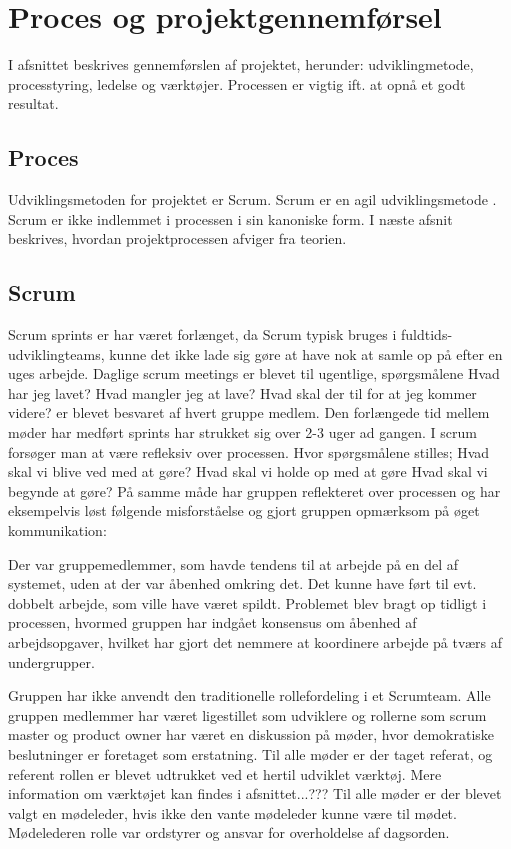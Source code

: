 \chapter{Proces og projektgennemførsel}

I afsnittet beskrives gennemførslen af projektet, herunder: udviklingmetode, processtyring, ledelse og værktøjer. Processen er vigtig ift. at opnå et godt resultat. 

\section{Proces}
Udviklingsmetoden for projektet er Scrum. Scrum er en agil udviklingsmetode \cite[kap. 1]{robertmartin2006}. Scrum er ikke indlemmet i processen i sin kanoniske form. I næste afsnit beskrives, hvordan projektprocessen afviger fra teorien.

\section{Scrum}
Scrum sprints er har været forlænget, da Scrum typisk bruges i fuldtids-udviklingteams, kunne det ikke lade sig gøre at have nok at samle op på efter en uges arbejde. Daglige scrum meetings er blevet til ugentlige, spørgsmålene Hvad har jeg lavet? Hvad mangler jeg at lave? Hvad skal der til for at jeg kommer videre? er blevet besvaret af hvert gruppe medlem. Den forlængede tid mellem møder har medført sprints har strukket sig over 2-3 uger ad gangen. I scrum forsøger man at være refleksiv over processen. Hvor spørgsmålene stilles; Hvad skal vi blive ved med at gøre? Hvad skal vi holde op med at gøre Hvad skal vi begynde at gøre? På samme måde har gruppen reflekteret over processen og har eksempelvis løst følgende misforståelse og gjort gruppen opmærksom på øget kommunikation:

Der var gruppemedlemmer, som havde tendens til at arbejde på en del af systemet, uden at der var åbenhed omkring det. Det kunne have ført til evt. dobbelt arbejde, som ville have været spildt. Problemet blev bragt op tidligt i processen, hvormed gruppen har indgået konsensus om åbenhed af arbejdsopgaver, hvilket har gjort det nemmere at koordinere arbejde på tværs af undergrupper.

Gruppen har ikke anvendt den traditionelle rollefordeling i et Scrumteam. Alle gruppen medlemmer har været ligestillet som udviklere og rollerne som scrum master og product owner har været en diskussion på møder, hvor demokratiske beslutninger er foretaget som erstatning. Til alle møder er der taget referat, og referent rollen er blevet udtrukket ved et hertil udviklet værktøj. Mere information om værktøjet kan findes i afsnittet...??? Til alle møder er der blevet valgt en mødeleder, hvis ikke den vante mødeleder kunne være til mødet. Mødelederen rolle var ordstyrer og ansvar for overholdelse af dagsorden. 

